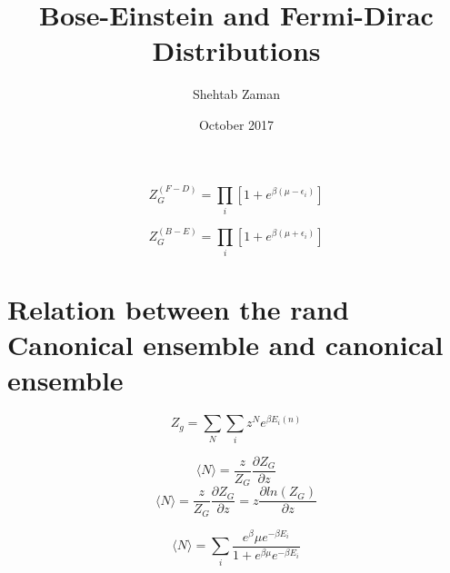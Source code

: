 \documentclass{article}
\title{Bose-Einstein and Fermi-Dirac Distributions}
\author{Shehtab Zaman}
\date{October 2017}
\begin{document}
$$ Z_G^{(F-D)} = \prod_{i} \left[{1+e^{\beta(\mu - \epsilon_i)}}\right]$$

$$ Z_G^{(B-E)} = \prod_{i} \left[{1+e^{\beta(\mu + \epsilon_i)}} \right]$$

\section{Relation between the rand Canonical ensemble and canonical ensemble}

$$ Z_g = \sum_{N} \sum_{i} z^N e^{\beta E_i (n)}$$

$$ \langle N \rangle = \frac{z}{Z_G} \frac{\partial Z_G}{\partial z}$$
$$ \langle N \rangle = \frac{z}{Z_G} \frac{\partial Z_G}{\partial z} = z \frac{\partial ln(Z_G)}{\partial z}$$


$$ \langle N \rangle = \sum_{i} \frac{e^\beta\mu e^{-\beta E_i}}{1 + e^{\beta\mu}e^{-\beta E_i}}$$
\end{document}
